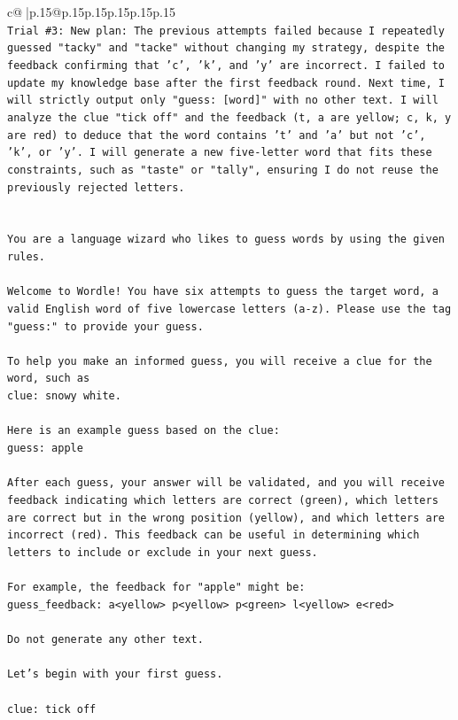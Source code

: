 \documentclass{article}
\begin{document}
{\begin{supertabular}{c@{$\;$}|p{.15\linewidth}@{}p{.15\linewidth}p{.15\linewidth}p{.15\linewidth}p{.15\linewidth}p{.15\linewidth}}
{{{\\ 
\texttt{Trial \#3: New plan: The previous attempts failed because I repeatedly guessed "tacky" and "tacke" without changing my strategy, despite the feedback confirming that 'c', 'k', and 'y' are incorrect. I failed to update my knowledge base after the first feedback round. Next time, I will strictly output only "guess: {[}word{]}" with no other text. I will analyze the clue "tick off" and the feedback (t, a are yellow; c, k, y are red) to deduce that the word contains 't' and 'a' but not 'c', 'k', or 'y'. I will generate a new five{-}letter word that fits these constraints, such as "taste" or "tally", ensuring I do not reuse the previously rejected letters.} \\
\\ 
\\ 
\texttt{You are a language wizard who likes to guess words by using the given rules.} \\
\\ 
\texttt{Welcome to Wordle! You have six attempts to guess the target word, a valid English word of five lowercase letters (a{-}z). Please use the tag "guess:" to provide your guess.} \\
\\ 
\texttt{To help you make an informed guess, you will receive a clue for the word, such as} \\
\texttt{clue: snowy white.} \\
\\ 
\texttt{Here is an example guess based on the clue: } \\
\texttt{guess: apple} \\
\\ 
\texttt{After each guess, your answer will be validated, and you will receive feedback indicating which letters are correct (green), which letters are correct but in the wrong position (yellow), and which letters are incorrect (red). This feedback can be useful in determining which letters to include or exclude in your next guess.} \\
\\ 
\texttt{For example, the feedback for "apple" might be:} \\
\texttt{guess\_feedback: a<yellow> p<yellow> p<green> l<yellow> e<red>} \\
\\ 
\texttt{Do not generate any other text.} \\
\\ 
\texttt{Let's begin with your first guess.} \\
\\ 
\texttt{clue: tick off} \\
            }
        }
    }
     \\ \\


\end{supertabular}}
\end{document}
